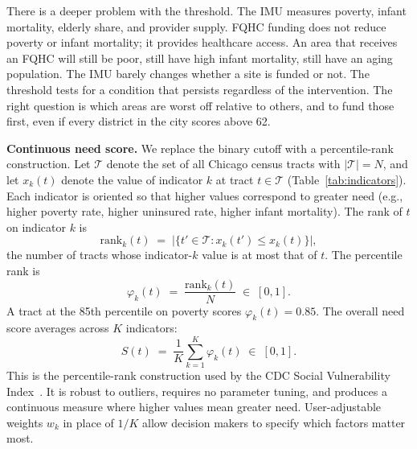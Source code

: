 \documentclass[11pt]{article}
\begin{document}
There is a deeper problem with the threshold. The IMU measures poverty, infant mortality, elderly share, and provider supply. FQHC funding does not reduce poverty or infant mortality; it provides healthcare access. An area that receives an FQHC will still be poor, still have high infant mortality, still have an aging population. The IMU barely changes whether a site is funded or not. The threshold tests for a condition that persists regardless of the intervention. The right question is which areas are worst off relative to others, and to fund those first, even if every district in the city scores above 62.

\medskip

\noindent\textbf{Continuous need score.} We replace the binary cutoff with a percentile-rank construction. Let $\mathcal{T}$ denote the set of all Chicago census tracts with $|\mathcal{T}| = N$, and let $x_k(t)$ denote the value of indicator $k$ at tract $t \in \mathcal{T}$ (Table~\ref{tab:indicators}). Each indicator is oriented so that higher values correspond to greater need (e.g., higher poverty rate, higher uninsured rate, higher infant mortality). The rank of $t$ on indicator $k$ is
\begin{equation}\label{eq:rank}
  \mathrm{rank}_k(t) \;=\; \bigl|\{t' \in \mathcal{T} : x_k(t') \leq x_k(t)\}\bigr|,
\end{equation}
the number of tracts whose indicator-$k$ value is at most that of $t$. The percentile rank is
\begin{equation}\label{eq:score}
  \varphi_k(t) \;=\; \frac{\mathrm{rank}_k(t)}{N} \;\in\; [0, 1].
\end{equation}
A tract at the 85th percentile on poverty scores $\varphi_k(t) = 0.85$. The overall need score averages across $K$ indicators:
\begin{equation}\label{eq:need}
  S(t) \;=\; \frac{1}{K} \sum_{k=1}^{K} \varphi_k(t) \;\in\; [0,1].
\end{equation}
This is the percentile-rank construction used by the CDC Social Vulnerability Index~\cite{CDC_SVI}. It is robust to outliers, requires no parameter tuning, and produces a continuous measure where higher values mean greater need. User-adjustable weights $w_k$ in place of $1/K$ allow decision makers to specify which factors matter most.
\end{document}
